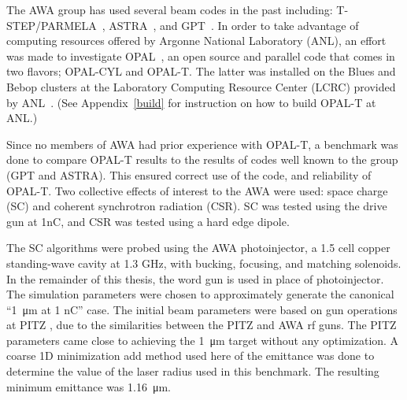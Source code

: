 \documentclass{iitthesis}
\newcommand{\nrnote}[1]{\textsf{{\color{blue}{ NN note:}   #1 }}}
\begin{document}
The AWA group has used several beam codes in the past including:
T-STEP/PARMELA~\cite{parmela}, ASTRA~\cite{astra}, and GPT~\cite{gpt}.  
In order to take advantage of computing resources offered by 
Argonne National Laboratory (ANL), an effort was made to investigate
OPAL~\cite{opal}, an open source and parallel code that comes in two flavors;  
OPAL-CYL and OPAL-T. The latter was installed on the Blues and Bebop clusters
at the Laboratory Computing Resource Center (LCRC) provided by ANL~\cite{lcrc}.
(See Appendix~\ref{build} for instruction on how to build OPAL-T at ANL.)

Since no members of AWA had prior experience with OPAL-T, a benchmark 
was done to compare \mbox{OPAL-T} results to the results of codes 
well known to the group (GPT and ASTRA). 
This ensured correct use of the code, and reliability of \mbox{OPAL-T}.
Two collective effects of interest to the AWA were used: 
space charge (SC) and coherent synchrotron radiation (CSR).
SC was tested using the drive gun at 1nC, and CSR was tested
using a hard edge dipole.


The SC algorithms were probed using the AWA photoinjector, 
a 1.5 cell copper standing-wave cavity at 1.3 GHz, 
with bucking, focusing, and matching solenoids. 
In the remainder of this thesis, the word gun is used 
in place of photoinjector. The simulation parameters were chosen to 
approximately generate the canonical “\SI{1}{\micro\metre} at 1 nC” case.
The initial beam parameters were based on gun operations at PITZ \cite{pitz},
due to the similarities between the PITZ and AWA rf guns.
The PITZ parameters came close to achieving the \SI{1}{\micro\metre}
target without any optimization. A coarse 1D minimization
\nrnote{add method used here} of the 
emittance was done to determine the value of the laser radius 
used in this benchmark. The resulting minimum emittance was   
\SI{1.16}{\micro\metre}. 
\end{document}
